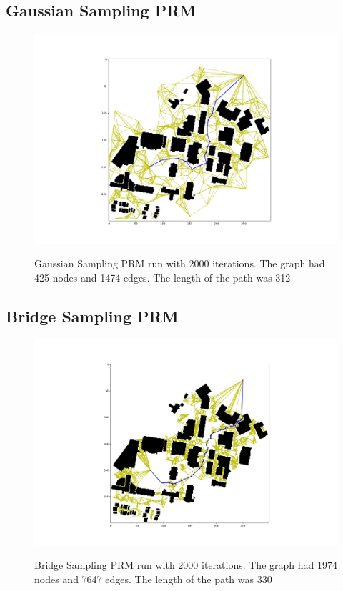 \documentclass[journal]{IEEEtran}
\begin{document}
    \subsection{Gaussian Sampling PRM}
    \begin{figure}[H]
        \includegraphics[width=\linewidth]{figures/GaussianPRM.png}
        \label{fig:GaussianPRM}
        \caption{Gaussian Sampling PRM run with 2000 iterations. The graph had 425 nodes and 1474 edges. The length of the path was 312}
    \end{figure} 

    \subsection{Bridge Sampling PRM}
    \begin{figure}[H]
        \includegraphics[width=\linewidth]{figures/BridgePRM.png}
        \label{fig:BridgePRM}
        \caption{Bridge Sampling PRM run with 2000 iterations. The graph had 1974 nodes and 7647 edges. The length of the path was 330}
    \end{figure} 
\end{document}
